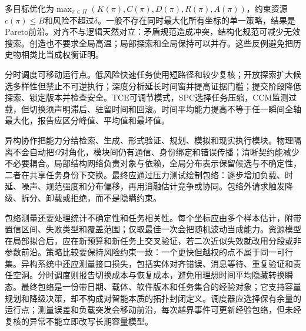 多目标优化为$\max_{\pi\in\Pi}(K(\pi),C(\pi),D(\pi),R(\pi),A(\pi))$，约束资源$c(\pi)\le B$和风险不超过$\delta$。一般不存在同时最大化所有坐标的单一策略，结果是Pareto前沿。对齐不与逻辑天然对立：矛盾规范造成冲突，结构化规范可减少无效搜索。创造也不要求全局高温；局部探索和全局保持可以并存。这些反例避免把历史物相类比当成权衡证明。

分时调度可移动运行点。低风险快速任务使用短路径和较少复核；开放探索扩大候选多样性但禁止不可逆执行；深度分析延长时间窗并提高证据门槛；提交阶段降低探索、锁定版本并检查安全。TCE可调节模式，SPC选择任务压缩，CCM监测过载，但切换须声明滞后、驻留时间和回滚。时间平均能力提高不等于任一瞬间全轴最大化，报告应区分峰值、平均值和最坏值。

异构协作把能力分给检索、生成、形式验证、规划、模拟和现实执行模块。物理隔离不会自动把$\Omega$对角化，模块间仍有通信、身份绑定和错误传播；清晰契约能减少不必要耦合。局部结构网络负责对象与依赖，全局分布表示保留候选与不确定性，二者在共享任务身份下交换。最终应通过压力测试绘制包络：逐步增加负载、时延、噪声、规范强度和分布偏移，再用消融估计竞争或协同。包络外请求触发降级、拆分、卸载或拒绝，而不是隐瞒约束。

包络测量还要处理统计不确定性和任务相关性。每个坐标应由多个样本估计，附带置信区间、失败类型和覆盖范围；仅取最佳一次会把随机波动当成能力。资源模型在局部拟合后，应在新预算和新任务上交叉验证，若二次近似失效就改用分段或非参数前沿。策略比较要保持风险约束一致：一个更快但越权的点不属于同一可行集。异构系统中还应测量接口损失，包括实体对齐错误、消息等待、重复验证和责任空洞。分时调度则报告切换成本与恢复成本，避免用理想时间平均隐藏转换瞬态。最终包络是一份带日期、载体、软件版本和任务集合的经验对象；它支持容量规划和降级决策，却不构成对智能本质的拓扑封闭定义。调度器应选择保有余量的运行点；测量误差和负载突发会移动前沿，每次越界事件可更新经验包络，但未经复核的异常不能立即改写长期容量模型。

